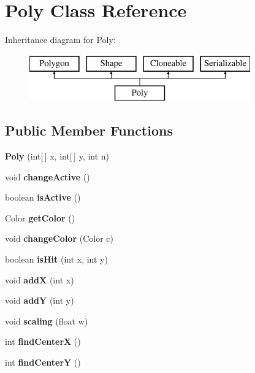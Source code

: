 \hypertarget{class_poly}{}\section{Poly Class Reference}
\label{class_poly}
Inheritance diagram for Poly\+:\begin{figure}[H]
\begin{center}
\leavevmode
\includegraphics[height=2.000000cm]{class_poly}
\end{center}
\end{figure}
\subsection*{Public Member Functions}
\begin{DoxyCompactItemize}
\item 
\mbox{\label{class_poly_ad24cfd4743b10e900bca1c2c2cabf3af}} 
{\bfseries Poly} (int\mbox{[}$\,$\mbox{]} x, int\mbox{[}$\,$\mbox{]} y, int n)
\item 
\mbox{\label{class_poly_abe407318f79cd8fbed337334bdfdc6f9}} 
void {\bfseries change\+Active} ()
\item 
\mbox{\label{class_poly_a8a1eca3567a02fa17eec76e3282eb1e1}} 
boolean {\bfseries is\+Active} ()
\item 
\mbox{\label{class_poly_afb1e52dd476370cff30d63e2ac9768fa}} 
Color {\bfseries get\+Color} ()
\item 
\mbox{\label{class_poly_a71acefcfe7fb0ea8100f2cf2617578ff}} 
void {\bfseries change\+Color} (Color c)
\item 
\mbox{\label{class_poly_a3e2d7553c1061c4c51ab2b49824e4ca8}} 
boolean {\bfseries is\+Hit} (int x, int y)
\item 
\mbox{\label{class_poly_af0e6bae618f0ce57e6e9e3cd3cc0c06f}} 
void {\bfseries addX} (int x)
\item 
\mbox{\label{class_poly_a411d0d5e8618d1b31a2c9d412299ff60}} 
void {\bfseries addY} (int y)
\item 
\mbox{\label{class_poly_a0b7b6b3fff39f8db9d136262d69a9248}} 
void {\bfseries scaling} (float w)
\item 
\mbox{\label{class_poly_aab4ca8dc1db70a4d3696227ee17ef42f}} 
int {\bfseries find\+CenterX} ()
\item 
\mbox{\label{class_poly_a267142033abf00fb96a8b2d3aefc920d}} 
int {\bfseries find\+CenterY} ()
\end{DoxyCompactItemize}
